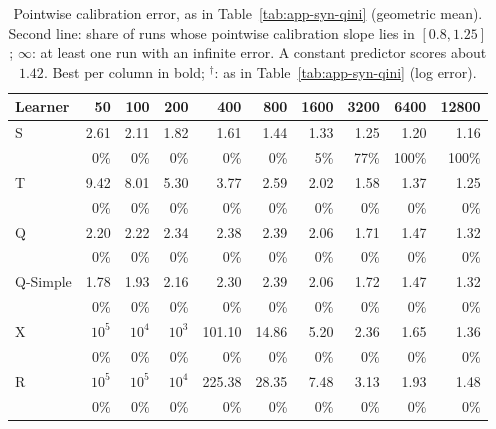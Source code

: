 \documentclass{article}
\begin{document}
\begin{table}[H]
\centering
\caption{Pointwise calibration error, as in Table~\ref{tab:app-syn-qini}
(geometric mean). Second line: share of runs whose pointwise calibration slope
lies in $[0.8, 1.25]$; $\infty$: at least one run with an infinite error. A
constant predictor scores about $1.42$. Best per column in bold;
$^\dagger$: as in Table~\ref{tab:app-syn-qini} (log error).}
\label{tab:app-syn-cal}
\footnotesize
\setlength{\tabcolsep}{3pt}
\begin{tabular}{l|rrrrrrrrr}
\hline
Learner & 50 & 100 & 200 & 400 & 800 & 1600 & 3200 & 6400 & 12800 \\
\hline
S & 2.61 & 2.11 & 1.82 & 1.61 & 1.44 & 1.33 & 1.25 & 1.20 & 1.16 \\
 & \scriptsize 0\% & \scriptsize 0\% & \scriptsize 0\% & \scriptsize 0\% & \scriptsize 0\% & \scriptsize 5\% & \scriptsize 77\% & \scriptsize 100\% & \scriptsize 100\% \\[2pt]
T & 9.42 & 8.01 & 5.30 & 3.77 & 2.59 & 2.02 & 1.58 & 1.37 & 1.25 \\
 & \scriptsize 0\% & \scriptsize 0\% & \scriptsize 0\% & \scriptsize 0\% & \scriptsize 0\% & \scriptsize 0\% & \scriptsize 0\% & \scriptsize 0\% & \scriptsize 0\% \\[2pt]
\hline
Q & 2.20 & 2.22 & 2.34 & 2.38 & 2.39 & 2.06 & 1.71 & 1.47 & 1.32 \\
 & \scriptsize 0\% & \scriptsize 0\% & \scriptsize 0\% & \scriptsize 0\% & \scriptsize 0\% & \scriptsize 0\% & \scriptsize 0\% & \scriptsize 0\% & \scriptsize 0\% \\[2pt]
Q-Simple & 1.78 & 1.93 & 2.16 & 2.30 & 2.39 & 2.06 & 1.72 & 1.47 & 1.32 \\
 & \scriptsize 0\% & \scriptsize 0\% & \scriptsize 0\% & \scriptsize 0\% & \scriptsize 0\% & \scriptsize 0\% & \scriptsize 0\% & \scriptsize 0\% & \scriptsize 0\% \\[2pt]
\hline
X & $10^{5}$ & $10^{4}$ & $10^{3}$ & 101.10 & 14.86 & 5.20 & 2.36 & 1.65 & 1.36 \\
 & \scriptsize 0\% & \scriptsize 0\% & \scriptsize 0\% & \scriptsize 0\% & \scriptsize 0\% & \scriptsize 0\% & \scriptsize 0\% & \scriptsize 0\% & \scriptsize 0\% \\[2pt]
R & $10^{5}$ & $10^{5}$ & $10^{4}$ & 225.38 & 28.35 & 7.48 & 3.13 & 1.93 & 1.48 \\
 & \scriptsize 0\% & \scriptsize 0\% & \scriptsize 0\% & \scriptsize 0\% & \scriptsize 0\% & \scriptsize 0\% & \scriptsize 0\% & \scriptsize 0\% & \scriptsize 0\% \\[2pt]

\end{tabular}
\end{table}
\end{document}
